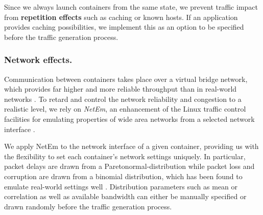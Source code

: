 Since we always launch containers from the same state, we prevent traffic impact from \textbf{repetition effects} such as caching or known hosts. If an application provides caching possibilities, we implement this as an option to be specified before the traffic generation process.


\subsubsection*{Network effects.}




Communication between containers takes place over a virtual bridge network, which provides far higher and more reliable throughput than in real-world networks \cite{iperf}. To retard and control the network reliability and congestion to a realistic level, we rely on \emph{NetEm}, an enhancement of the Linux traffic control facilities for emulating properties of wide area networks from a selected network interface \cite{hemminger2005network}.


We apply NetEm to the network interface of a given container, providing us with the flexibility to set each container's network settings uniquely. In particular, packet delays are drawn from a Paretonormal-distribution while packet loss and corruption are drawn from a binomial distribution, which has been found to emulate real-world settings well \cite{jurgelionis2011empirical}. Distribution parameters such as mean or correlation as well as available bandwidth can either be manually specified or drawn randomly before the traffic generation process.

